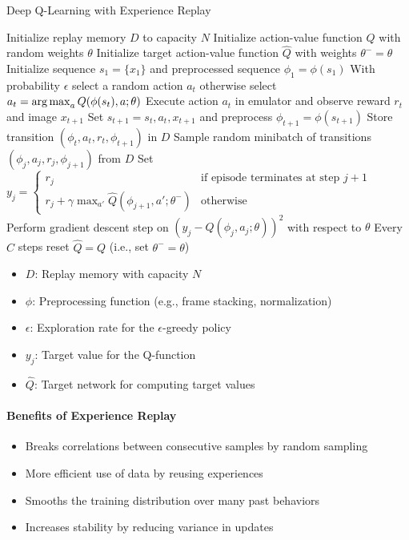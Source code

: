 \documentclass[11pt]{article}
\newcommand{\argmax}{\operatornamewithlimits{arg\,max}}
\begin{document}
\begin{algorithm}
\caption{Deep Q-Learning with Experience Replay}
\begin{algorithmic}[1]
\State Initialize replay memory $D$ to capacity $N$
\State Initialize action-value function $Q$ with random weights $\theta$
\State Initialize target action-value function $\hat{Q}$ with weights $\theta^- = \theta$
    \State Initialize sequence $s_1 = \{x_1\}$ and preprocessed sequence $\phi_1 = \phi(s_1)$
        \State With probability $\epsilon$ select a random action $a_t$
        \State otherwise select $a_t = \argmax_a Q(\phi(s_t), a; \theta)$
        \State Execute action $a_t$ in emulator and observe reward $r_t$ and image $x_{t+1}$
        \State Set $s_{t+1} = s_t, a_t, x_{t+1}$ and preprocess $\phi_{t+1} = \phi(s_{t+1})$
        \State Store transition $(\phi_t, a_t, r_t, \phi_{t+1})$ in $D$
        \State Sample random minibatch of transitions $(\phi_j, a_j, r_j, \phi_{j+1})$ from $D$
        \State Set $y_j = 
            \begin{cases}
                r_j & \text{if episode terminates at step } j+1 \\
                r_j + \gamma \max_{a'} \hat{Q}(\phi_{j+1}, a'; \theta^-) & \text{otherwise}
            \end{cases}$
        \State Perform gradient descent step on $(y_j - Q(\phi_j, a_j; \theta))^2$ with respect to $\theta$
        \State Every $C$ steps reset $\hat{Q} = Q$ (i.e., set $\theta^- = \theta$)
    \EndFor
\EndFor
\end{algorithmic}
\end{algorithm}

\begin{tcolorbox}[title=Notation Overview]
\begin{itemize}
    \item $D$: Replay memory with capacity $N$
    \item $\phi$: Preprocessing function (e.g., frame stacking, normalization)
    \item $\epsilon$: Exploration rate for the $\epsilon$-greedy policy
    \item $y_j$: Target value for the Q-function
    \item $\hat{Q}$: Target network for computing target values
\end{itemize}
\end{tcolorbox}

\paragraph{Benefits of Experience Replay}
\begin{itemize}
    \item Breaks correlations between consecutive samples by random sampling
    \item More efficient use of data by reusing experiences
    \item Smooths the training distribution over many past behaviors
    \item Increases stability by reducing variance in updates
\end{itemize}
\end{document}
